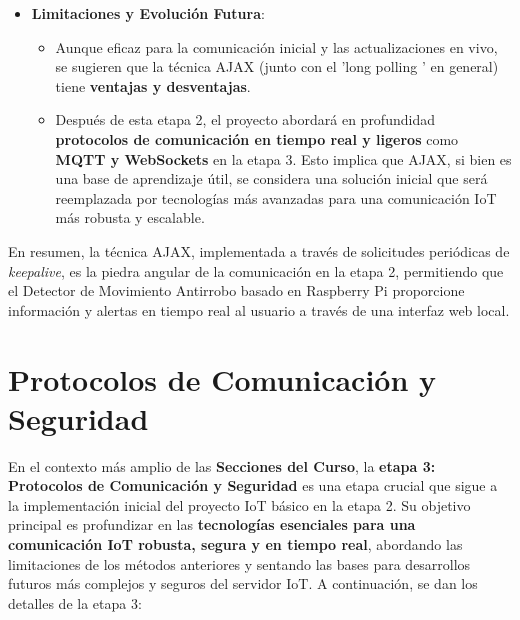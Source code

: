 \documentclass{report}
\begin{document}
\begin{itemize}
    \item \textbf{Limitaciones y Evolución Futura}:
    \begin{itemize}
        \item Aunque eficaz para la comunicación inicial y las actualizaciones en vivo, se  sugieren que la técnica AJAX (junto con el 
        'long polling ' en general) tiene \textbf{ventajas y desventajas}.
        \item Después de esta etapa 2, el proyecto abordará en profundidad \textbf{protocolos de comunicación en tiempo real y ligeros} como 
        \textbf{MQTT y WebSockets} en la etapa 3. Esto implica que AJAX, si bien es una base de aprendizaje útil, se considera una solución 
        inicial que será reemplazada por tecnologías más avanzadas para una comunicación IoT más robusta y escalable.
    \end{itemize}
\end{itemize}
En resumen, la técnica AJAX, implementada a través de solicitudes periódicas de \textit{keepalive}, es la piedra angular de la comunicación en la 
etapa 2, permitiendo que el Detector de Movimiento Antirrobo basado en Raspberry Pi proporcione información y alertas en tiempo real al usuario a 
través de una interfaz web local.

\section{Protocolos de Comunicación y Seguridad}
En el contexto más amplio de las \textbf{Secciones del Curso}, la \textbf{etapa 3: Protocolos de Comunicación y Seguridad} es una etapa crucial que 
sigue a la implementación inicial del proyecto IoT básico en la etapa 2. Su objetivo principal es profundizar en las \textbf{tecnologías esenciales 
para una comunicación IoT robusta, segura y en tiempo real}, abordando las limitaciones de los métodos anteriores y sentando las bases para desarrollos 
futuros más complejos y seguros del servidor IoT. A continuación, se dan los detalles de la etapa 3:
\end{document}
